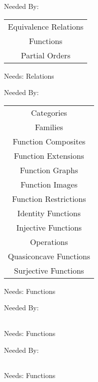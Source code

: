 Needed By: \begin{tabular}{c} Equivalence Relations \\  Functions \\  Partial Orders \\ 
\end{tabular}
\clearpage{}

\newpage
\label{functions}


\clearpage
Needs:  Relations 

Needed By: \begin{tabular}{c} Categories \\  Families \\  Function Composites \\  Function Extensions \\  Function Graphs \\  Function Images \\  Function Restrictions \\  Identity Functions \\  Injective Functions \\  Operations \\  Quasiconcave Functions \\  Surjective Functions \\ 
\end{tabular}
\clearpage{}

\newpage
\label{function_graphs}


\clearpage
Needs:  Functions 

Needed By: \begin{tabular}{c}
\end{tabular}
\clearpage{}

\newpage
\label{function_images}


\clearpage
Needs:  Functions 

Needed By: \begin{tabular}{c}
\end{tabular}
\clearpage{}

\newpage
\label{function_restrictions}


\clearpage
Needs:  Functions 

